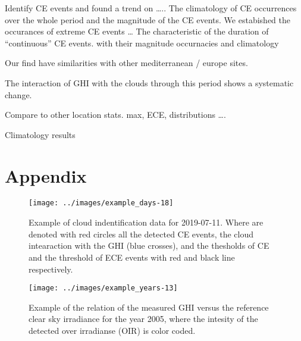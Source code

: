 \documentclass[preprint, 3p,
authoryear]{elsarticle} %
\begin{document}
Identify CE events and found a trend on \ldots.. The climatology of CE
occurrences over the whole period and the magnitude of the CE events. We
estabished the occurances of extreme CE events \ldots{} The
characteristic of the duration of ``continuous'' CE events. with their
magnitude occurnacies and climatology

Our find have similarities with other mediterranean / europe sites.

The interaction of GHI with the clouds through this period shows a
systematic change.

Compare to other location stats. max, ECE, distributions \ldots.

Climatology results

\hypertarget{appendix}{%
\section*{Appendix}\label{appendix}}

\begin{figure}

{\centering \texttt{[image: ../images/example\_days-18]} 

}

\caption{Example of cloud indentification data for 2019-07-11. Where are denoted with red circles all the detected CE events, the cloud intearaction with the GHI (blue crosses), and the thesholds of CE and the threshold of ECE events with red and black line respectively.}\label{fig:example-day}
\end{figure}

\begin{figure}

{\centering \texttt{[image: ../images/example\_years-13]} 

}

\caption{Example of the relation of the measured GHI versus the reference clear sky irradiance for the year 2005, where the intesity of the detected over irradianse (OIR) is color coded.}\label{fig:example-year}
\end{figure}


\end{document}
